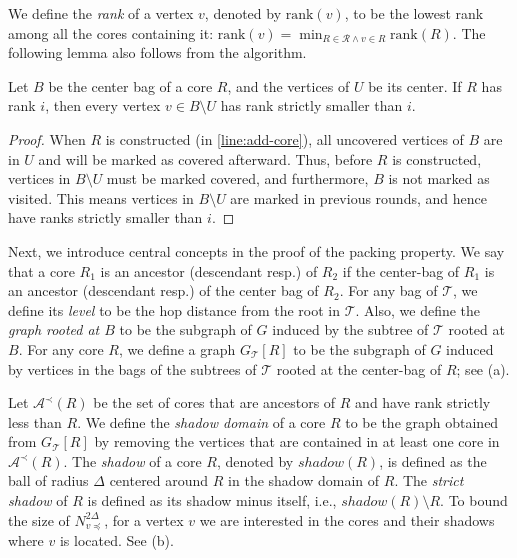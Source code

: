 \documentclass{theoretics}
\newcommand{\mt}{\mathcal{T}}
\newcommand{\rank}{\mathrm{rank}}
\def\coreSet{\mathcal{R}}
\def\core{R}
\def\shadow{shadow}
\begin{document}
We define the \emph{rank} of a vertex $v$, denoted by $\rank(v)$, to be the lowest rank among all the cores containing it: $\rank(v) = \min_{\core\in \coreSet \wedge  v\in \core}\rank(\core)$.  The following lemma also follows from the algorithm.
\begin{lemma}
	\label{lem:noncentervertices}Let $B$ be the center bag of a core $\core$, and the vertices of $U$ be its center. If $\core$ has rank $i$, then every vertex $v\in B\setminus U$ has rank strictly smaller than $i$. 
\end{lemma}
\begin{proof}
	When $\core$ is constructed (in \cref{line:add-core}), all uncovered vertices of $B$ are in $U$ and will be marked as covered afterward. Thus, before $\core$ is constructed, vertices in $B\setminus U$ must be marked covered, and furthermore, $B$ is not marked as visited. This means vertices in $B\setminus U$ are marked in previous rounds, and hence have ranks strictly smaller than $i$. 
\end{proof}

 Next, we introduce central concepts in the proof of the packing property. We say that a core $\core_1$ is an ancestor (descendant resp.) of $\core_2$ if the center-bag of $\core_1$ is an ancestor (descendant resp.) of the center bag of $\core_2$. For any bag of $\mathcal{T}$, we define its \emph{level} to be the hop distance from the root in $\mathcal{T}$. Also, we define the \emph{graph rooted at $B$} to be the subgraph of $G$ induced by the subtree of $\mathcal{T}$ rooted at $B$. For any core $\core$, we define a graph $G_{\mt}[\core]$ to be the subgraph of $G$ induced by vertices in the bags of the subtrees of $\mt$ rooted at the center-bag of $\core$; see (a). 

Let $\mathcal{A}^{\prec}(\core)$ be the set of cores that are ancestors of $\core$ and have rank strictly less than $\core$. We define the \emph{shadow domain} of a core $\core$ to be the graph obtained from $G_{\mt}[\core]$ by removing the vertices that are contained in at least one core in $\mathcal{A}^{\prec}(\core)$. The \emph{shadow} of a core $\core$, denoted by  $\shadow({\core})$, is defined as the ball of radius $\Delta$ centered around $\core$ in the shadow domain of $\core$. The \emph{strict shadow} of $\core$ is defined as its shadow minus itself, i.e., $\shadow({\core}) \setminus \core$. To bound the size of $N_{v\preceq}^{2\Delta}$, for a vertex $v$ we are interested in the cores and their shadows where $v$ is located. See (b). 
\end{document}
